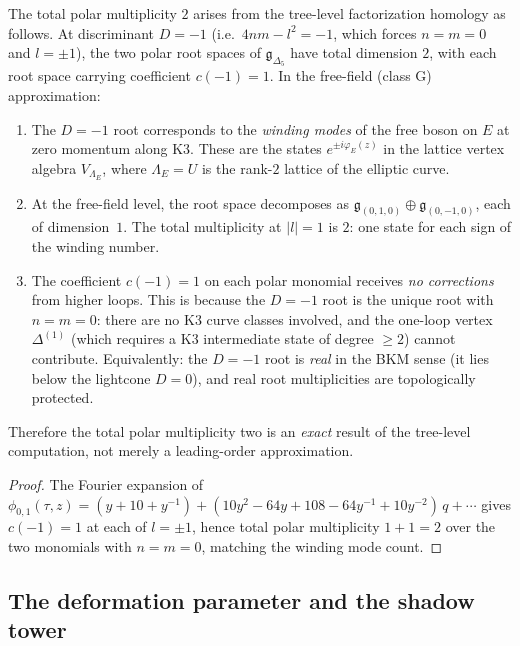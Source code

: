 \begin{conjecture}
\label{conj:k3-c-minus-1}
\ClaimStatusConjectured
The total polar multiplicity $2$ arises from the tree-level factorization
homology as follows. At discriminant $D = -1$ (i.e.\
$4nm - l^2 = -1$, which forces $n = m = 0$ and $l = \pm 1$),
the two polar root spaces of $\mathfrak{g}_{\Delta_5}$ have total
dimension $2$, with each root space carrying coefficient $c(-1)=1$.
In the free-field (class G) approximation:
\begin{enumerate}[label=(\roman*)]
\item The $D = -1$ root corresponds to the \emph{winding modes}
 of the free boson on $E$ at zero momentum along K3. These
 are the states $e^{\pm i\varphi_E(z)}$ in the lattice vertex
 algebra $V_{\Lambda_E}$, where $\Lambda_E = U$ is the
 rank-$2$ lattice of the elliptic curve.
\item At the free-field level, the root space decomposes as
 $\mathfrak{g}_{(0,1,0)} \oplus \mathfrak{g}_{(0,-1,0)}$,
 each of dimension~$1$. The total multiplicity at $|l| = 1$
 is $2$: one state for each sign of the
 winding number.
\item The coefficient $c(-1)=1$ on each polar monomial receives
\emph{no corrections}
 from higher loops. This is because the $D = -1$ root
 is the unique root with $n = m = 0$: there are no K3
 curve classes involved, and the one-loop vertex
 $\Delta^{(1)}$ (which requires a K3 intermediate state
 of degree $\geq 2$) cannot contribute.
 Equivalently: the $D = -1$ root is \emph{real}
 in the BKM sense (it lies below the lightcone
 $D = 0$), and real root multiplicities are
 topologically protected.
\end{enumerate}
Therefore the total polar multiplicity two is an \emph{exact} result
of the tree-level computation, not merely a leading-order approximation.
\end{conjecture}

\begin{proof}[Proof]
The Fourier expansion of $\phi_{0,1}(\tau, z) = (y + 10 + y^{-1})
+ (10y^2 - 64y + 108 - 64y^{-1} + 10y^{-2})\,q + \cdots$
gives $c(-1)=1$ at each of $l=\pm1$, hence total polar multiplicity
$1+1=2$ over the two monomials with $n=m=0$, matching the winding mode
count.
\end{proof}

\subsection{The deformation parameter and the shadow tower}
\label{subsec:k3-fact-deformation}

